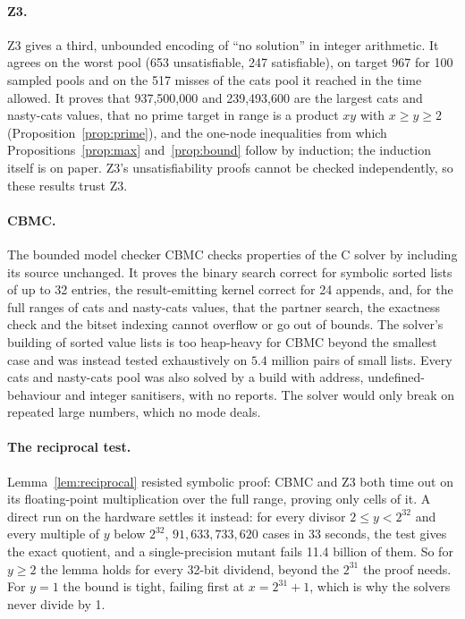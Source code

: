 \documentclass[11pt,a4paper]{article}
\theoremstyle{definition}
\theoremstyle{remark}
\begin{document}
\paragraph{Z3.}
Z3 gives a third, unbounded encoding of ``no solution'' in integer arithmetic. It agrees on the worst pool
(653 unsatisfiable, 247 satisfiable), on target 967 for 100 sampled pools and on the 517 misses of the cats
pool it reached in the time allowed. It proves that 937{,}500{,}000 and 239{,}493{,}600 are the largest
cats and nasty-cats values, that no prime target in range is a product $xy$ with $x \ge y \ge 2$
(Proposition~\ref{prop:prime}), and the one-node inequalities from which Propositions~\ref{prop:max}
and~\ref{prop:bound} follow by induction; the induction itself is on paper. Z3's unsatisfiability proofs
cannot be checked independently, so these results trust Z3.

\paragraph{CBMC.}
The bounded model checker CBMC checks properties of the C solver by including its source unchanged.
It proves the binary search correct for symbolic sorted lists of up to 32 entries, the result-emitting
kernel correct for 24 appends, and, for the full ranges of cats and nasty-cats values, that the partner
search, the exactness check and the bitset indexing cannot overflow or go out of bounds. The solver's
building of sorted value lists is too heap-heavy for CBMC beyond the smallest case and was instead tested
exhaustively on $5.4$ million pairs of small lists. Every cats and nasty-cats pool was also solved by a
build with address, undefined-behaviour and integer sanitisers, with no reports. The solver would only
break on repeated large numbers, which no mode deals.

\paragraph{The reciprocal test.}
Lemma~\ref{lem:reciprocal} resisted symbolic proof: CBMC and Z3 both time out on its floating-point
multiplication over the full range, proving only cells of it. A direct run on the hardware settles it
instead: for every divisor $2 \le y < 2^{32}$ and every multiple of $y$ below $2^{32}$, $91{,}633{,}733{,}620$
cases in 33 seconds, the test gives the exact quotient, and a single-precision mutant fails 11.4 billion of
them. So for $y \ge 2$ the lemma holds for every 32-bit dividend, beyond the $2^{31}$ the proof needs. For
$y = 1$ the bound is tight, failing first at $x = 2^{31} + 1$, which is why the solvers never divide by 1.
\end{document}
